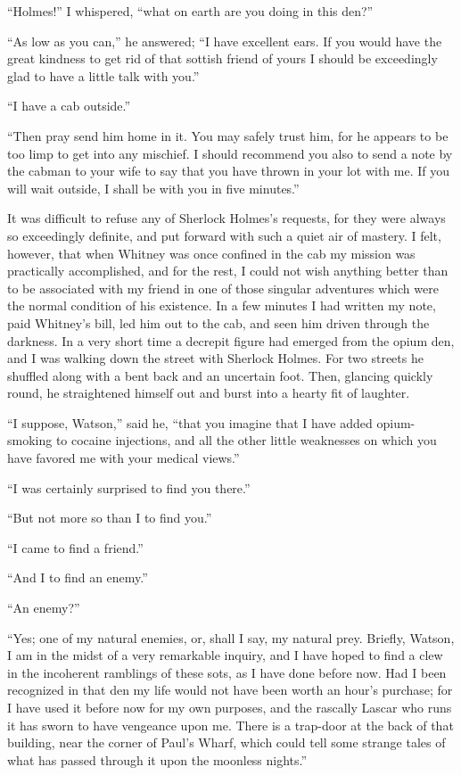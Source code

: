 “Holmes!” I whispered, “what on earth are you doing in
this den?”

“As low as you can,” he answered; “I have excellent ears.
If you would have the great kindness to get rid of that sottish
friend of yours I should be exceedingly glad to have a little
talk with you.”

“I have a cab outside.”

“Then pray send him home in it. You may safely trust
him, for he appears to be too limp to get into any mischief.
I should recommend you also to send a note by the cabman
to your wife to say that you have thrown in your lot with me.
If you will wait outside, I shall be with you in five minutes.”

It was difficult to refuse any of Sherlock Holmes’s requests,
for they were always so exceedingly definite, and put forward
with such a quiet air of mastery. I felt, however, that when
Whitney was once confined in the cab my mission was practically
accomplished, and for the rest, I could not wish anything
better than to be associated with my friend in one of
those singular adventures which were the normal condition of
his existence. In a few minutes I had written my note, paid
Whitney’s bill, led him out to the cab, and seen him driven
through the darkness. In a very short time a decrepit figure
had emerged from the opium den, and I was walking down
the street with Sherlock Holmes. For two streets he shuffled
along with a bent back and an uncertain foot. Then, glancing
quickly round, he straightened himself out and burst into a
hearty fit of laughter.

“I suppose, Watson,” said he, “that you imagine that I
have added opium-smoking to cocaine injections, and all the
other little weaknesses on which you have favored me with
your medical views.”

“I was certainly surprised to find you there.”

“But not more so than I to find you.”

“I came to find a friend.”

“And I to find an enemy.”

“An enemy?”

“Yes; one of my natural enemies, or, shall I say, my natural
prey. Briefly, Watson, I am in the midst of a very remarkable
inquiry, and I have hoped to find a clew in the incoherent
ramblings of these sots, as I have done before now.
Had I been recognized in that den my life would not have
been worth an hour’s purchase; for I have used it before now
for my own purposes, and the rascally Lascar who runs it has
sworn to have vengeance upon me. There is a trap-door at
the back of that building, near the corner of Paul’s Wharf,
which could tell some strange tales of what has passed through
it upon the moonless nights.”

